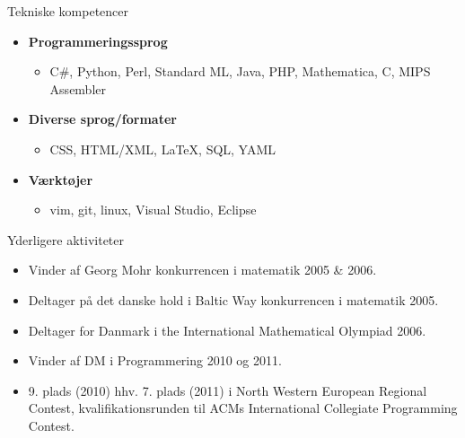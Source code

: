 \documentclass[11pt,oneside,a4paper]{article}
\newenvironment{ressection}[1]{
    \vspace{4pt}
    {\fontfamily{phv}\selectfont\Large#1}
    \begin{itemize}
    \vspace{3pt}
}{
    \end{itemize}
}
\newcommand{\resitem}[1]{
    \vspace{-4pt}
    \item \begin{flushleft} #1 \end{flushleft}
}
\newenvironment{reslist}[1]{
    \resitem{\textbf{#1}}
    \vspace{-2pt}
    \begin{itemize}
}{
    \end{itemize}
}
\begin{document}

\begin{ressection}{Tekniske kompetencer}
    \begin{reslist}{Programmeringssprog}
        \resitem{C\#, Python, Perl, Standard ML, Java, PHP, Mathematica, C, MIPS Assembler}
    \end{reslist}

    \begin{reslist}{Diverse sprog/formater}
        \resitem{CSS, HTML/XML, \LaTeX, SQL, YAML}
    \end{reslist}

    \begin{reslist}{Værktøjer}
        \resitem{vim, git, linux, Visual Studio, Eclipse}
    \end{reslist}
\end{ressection}


\begin{ressection}{Yderligere aktiviteter}

    \resitem{Vinder af Georg Mohr konkurrencen i matematik 2005 \& 2006.}

    \resitem{Deltager på det danske hold i Baltic Way konkurrencen i matematik 2005.}

    \resitem{Deltager for Danmark i the International Mathematical Olympiad 2006.}

    \resitem{Vinder af DM i Programmering 2010 og 2011.}

    \resitem{9. plads (2010) hhv. 7. plads (2011) i North Western European Regional Contest,
             kvalifikationsrunden til ACMs International Collegiate Programming Contest.}

\end{ressection}
\end{document}
